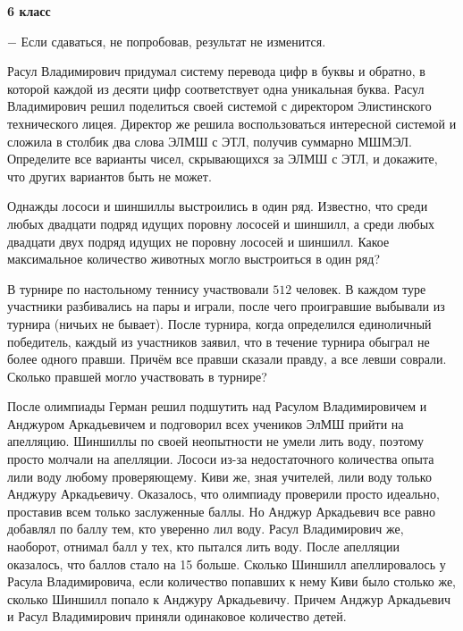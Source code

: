 \hspace{3mm}

\centerline{\bf \huge 6 класс}

\begin{flushright}
    \scriptsize{ $-$ Если сдаваться, не попробовав, результат не изменится.}
\end{flushright}

 Расул Владимирович придумал систему перевода цифр в буквы и обратно, в которой каждой из десяти цифр соответствует одна уникальная буква. Расул Владимирович решил поделиться своей системой с директором Элистинского технического лицея. Директор же решила воспользоваться интересной системой и сложила в столбик два слова ЭЛМШ с ЭТЛ, получив суммарно МШМЭЛ. Определите все варианты чисел, скрывающихся за ЭЛМШ с ЭТЛ, и докажите, что других вариантов быть не может.

\hspace{3mm}

 Однажды лососи и шиншиллы выстроились в один ряд. Известно, что среди любых двадцати подряд идущих поровну лососей и шиншилл, а среди любых двадцати двух подряд идущих не поровну лососей и шиншилл. Какое максимальное количество животных могло выстроиться в один ряд?

\hspace{3mm}

 В турнире по настольному теннису участвовали $512$ человек. В каждом туре участники разбивались на пары и играли, после чего проигравшие выбывали из турнира (ничьих не бывает). После турнира, когда определился единоличный победитель, каждый из участников заявил, что в течение турнира обыграл не более одного правши. Причём все правши сказали правду, а все левши соврали. Сколько правшей могло участвовать в турнире?

\hspace{3mm}

\newpage

\hspace{3mm}


 После олимпиады Герман решил подшутить над Расулом Владимировичем и Анджуром Аркадьевичем и подговорил всех учеников ЭлМШ прийти на апелляцию. Шиншиллы по своей неопытности не умели лить воду, поэтому просто молчали на апелляции. Лососи из-за недостаточного количества опыта лили воду любому проверяющему. Киви же, зная учителей, лили воду только Анджуру Аркадьевичу. Оказалось, что олимпиаду проверили просто идеально, проставив всем только заслуженные баллы. Но Анджур Аркадьевич все равно добавлял по баллу тем, кто уверенно лил воду. Расул Владимирович же, наоборот, отнимал балл у тех, кто пытался лить воду. После апелляции оказалось, что баллов стало на 15 больше. Сколько Шиншилл апеллировалось у Расула Владимировича, если количество попавших к нему Киви было столько же, сколько Шиншилл попало к Анджуру Аркадьевичу. Причем Анджур Аркадьевич и Расул Владимирович приняли одинаковое количество детей.

